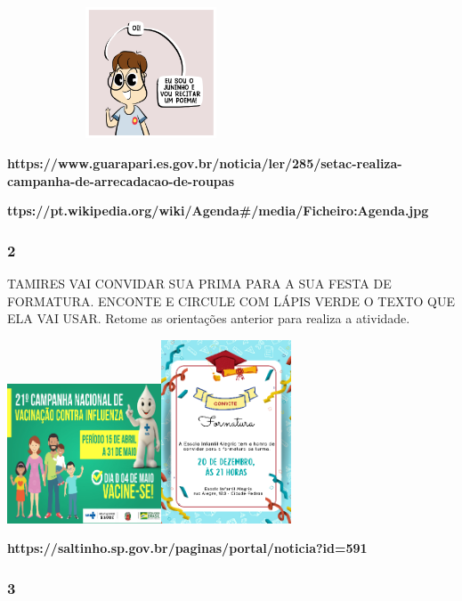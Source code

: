 \includegraphics[width=3.36528in,height=1.53611in]{media/image97.png}

\textbf{https://www.guarapari.es.gov.br/noticia/ler/285/setac-realiza-campanha-de-arrecadacao-de-roupas}

\textbf{ttps://pt.wikipedia.org/wiki/Agenda\#/media/Ficheiro:Agenda.jpg}

\subsubsection{2}\label{section-43}

TAMIRES VAI CONVIDAR SUA PRIMA PARA A SUA FESTA DE FORMATURA. ENCONTE E
CIRCULE COM LÁPIS VERDE O TEXTO QUE ELA VAI USAR. Retome as orientações
anterior para realiza a atividade.

\includegraphics[width=1.80556in,height=1.63403in]{media/image100.png}\includegraphics[width=1.51458in,height=2.14444in]{media/image103.png}

\textbf{https://saltinho.sp.gov.br/paginas/portal/noticia?id=591}

\subsubsection{3}\label{section-44}

